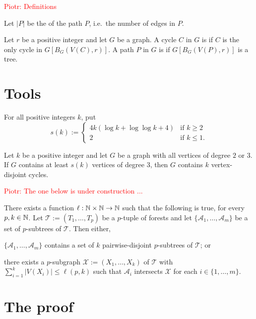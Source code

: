 \documentclass{patmorin}
\newcommand{\piotr}[1]{\textcolor{red}{Piotr: #1}}
\begin{document}

\piotr{Definitions}

Let $|P|$ be the  of the path $P$, i.e.\ the number of edges in $P$.

Let $r$ be a positive integer and let $G$ be a graph.
A cycle $C$ in $G$ is 
if $C$ is the only cycle in $G[B_G(V(C),r)]$.  A path $P$ in $G$ is  if $G[B_G(V(P),r)]$ is a tree.

\section{Tools}
For all positive integers $k$, put
\[
s(k):=\begin{cases}
4k(\log k + \log\log k +4)&\textrm{if $k\geq2$}\\
2&\textrm{if $k\leq1$.}
\end{cases}
\]
\begin{thm}
\label{thm:simonovits}
Let $k$ be a positive integer and
let $G$ be a graph with all vertices of degree $2$ or $3$.
If $G$ contains at least $s(k)$ vertices of degree $3$, then
$G$ contains $k$ vertex-disjoint cycles.
\end{thm}

\piotr{The one below is under construction ...}
\begin{thm}\label{thm:gyarfas-lehel}
   There exists a function $\ell:\mathbb{N}\times\mathbb{N}\to\mathbb{N}$ such that the following is true, for every $p,k\in\mathbb{N}$.
   Let $\mathcal{T}:=(T_1,\ldots,T_p)$ be a $p$-tuple of forests and let $\{\mathcal{A}_1,\ldots,\mathcal{A}_m\}$ be a set of $p$-subtrees of $\mathcal{T}$. Then either,
   \begin{compactenum}[(a)]
     \item $\{\mathcal{A}_1,\ldots,\mathcal{A}_m\}$ contains a set of $k$ pairwise-disjoint $p$-subtrees of $\mathcal{T}$; or
     \item there exists a $p$-subgraph $\mathcal{X}:=(X_1,\ldots,X_k)$ of $\mathcal{T}$ with $\sum_{i=1}^k|V(X_i)|\le \ell(p,k)$ such that $\mathcal{A}_i$ intersects $\mathcal{X}$ for each $i\in\{1,\ldots,m\}$.
   \end{compactenum}
\end{thm}


\section{The proof}
\end{document}
